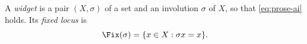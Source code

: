 \begin{definition}[Widget]\label{sy-0001-ai}
A \emph{widget} is a pair $(X,\sigma)$ of a set and an involution $\sigma$ of $X$, so that \eqref{eq:prose-ai} holds. Its \emph{fixed locus} is
\begin{equation}\label{eq:fix-ai}
\Fix(\sigma) = \{x \in X : \sigma x = x\}.
\end{equation}
\end{definition}